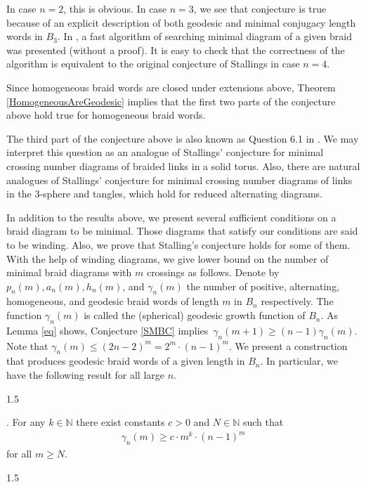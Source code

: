 \documentclass[11pt]{amsart}
\theoremstyle{plain}
\theoremstyle{definition}
\numberwithin{equation}{section}
\begin{document}
In case $n=2$, this is obvious. In case $n=3$, we see that conjecture is true because of an explicit description of both geodesic and minimal conjugacy length words in $B_3$. In \cite{FourStrandsAlgorithm}, a fast algorithm of searching minimal diagram of a given braid was presented (without a proof). It is easy to check that the correctness of the algorithm is equivalent to the original conjecture of Stallings in case $n=4$.

Since homogeneous braid words are closed under extensions above, Theorem \ref{HomogeneousAreGeodesic} implies that the first two parts of the conjecture above hold true for homogeneous braid words.

The third part of the conjecture above is also known as Question 6.1 in \cite{AS}. We may interpret this question as an analogue of Stallings' conjecture for minimal crossing number diagrams of braided links in a solid torus.
Also, there are natural analogues of Stallings' conjecture for minimal crossing number diagrams of links in the 3-sphere and tangles, which hold for reduced alternating diagrams. 

In addition to the results above, we present several sufficient conditions on a braid diagram to be minimal. Those diagrams that satisfy our conditions are said to be winding. Also, we prove that Stalling's conjecture holds for some of them. With the help of winding diagrams, we give lower bound on the number of minimal braid diagrams with $m$ crossings as follows. Denote by $p_n(m), a_n(m), h_n(m)$, and $\gamma_n(m)$ the number of positive, alternating, homogeneous, and geodesic braid words of length $m$ in $B_n$ respectively. The function $\gamma_n(m)$ is called the (spherical) geodesic growth function of $B_n$. As Lemma \ref{eq} shows, Conjecture \ref{SMBC} \mbox{implies $\gamma_n(m+1) \geq (n-1)\gamma_n(m)$.} Note that $\gamma_n(m)\leq (2n-2)^m = 2^m \cdot (n-1)^m$. 
We present a construction that produces geodesic braid words of a given length in $B_n$. In particular, we have the following result for all large $n$.
\begin{spacing}{1.5}
\end{spacing}

. For any $k \in \mathbb{N}$ there exist constants $c>0$ and $N \in \mathbb{N}$ such that
\begin{align*}
\gamma_n(m) \geq c\cdot m^k \cdot (n-1)^m
\end{align*}
for all $m \geq N$.
\begin{spacing}{1.5}
\end{spacing}
\end{document}
